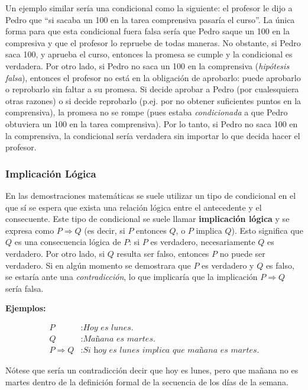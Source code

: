 Un ejemplo similar sería una condicional como la siguiente: el profesor le dijo a Pedro que ``si sacaba un 100 en la tarea comprensiva pasaría el curso''. La única forma para que esta condicional fuera falsa sería que Pedro saque un 100 en la compresiva y que el profesor lo repruebe de todas maneras. No obstante, si Pedro saca 100, y aprueba el curso, entonces la promesa se cumple y la condicional es verdadera. Por otro lado, si Pedro no saca un 100 en la comprensiva (\textit{hipótesis falsa}), entonces el profesor no está en la obligación de aprobarlo: puede aprobarlo o reprobarlo sin faltar a su promesa. Si decide aprobar a Pedro (por cualesquiera otras razones) o si decide reprobarlo (p.ej. por no obtener suficientes puntos en la comprensiva), la promesa no se rompe (pues estaba \textit{condicionada} a que Pedro obtuviera un 100 en la tarea comprensiva). Por lo tanto, si Pedro no saca 100 en la comprensiva, la condicional sería verdadera sin importar lo que decida hacer el profesor.

\subsubsection{Implicación Lógica}

En las demostraciones matemáticas se suele utilizar un tipo de condicional en el que sí se espera que exista una relación lógica entre el antecedente y el consecuente. Este tipo de condicional se suele llamar \textbf{implicación lógica} y se expresa como $P \Rightarrow Q$ (es decir, si $P$ entonces $Q$, o $P$ implica $Q$). Esto significa que $Q$ es una consecuencia lógica de $P$: si $P$ es verdadero, necesariamente $Q$ es verdadero. Por otro lado, si $Q$ resulta ser falso, entonces $P$ no puede ser verdadero. Si en algún momento se demostrara que $P$ es verdadero y $Q$ es falso, se estaría ante una \textit{contradicción}, lo que implicaría que la implicación $P \Rightarrow Q$ sería falsa.

\textbf{Ejemplos:}

\begin{equation*}
    \begin{split}
        P &: \textit{Hoy es lunes.} \\
        Q &: \textit{Mañana es martes.} \\
        P \Rightarrow Q &: \textit{Si hoy es lunes implica que mañana es martes.}
    \end{split}
\end{equation*}

Nótese que sería un contradicción decir que hoy es lunes, pero que mañana no es martes dentro de la definición formal de la secuencia de los días de la semana.

